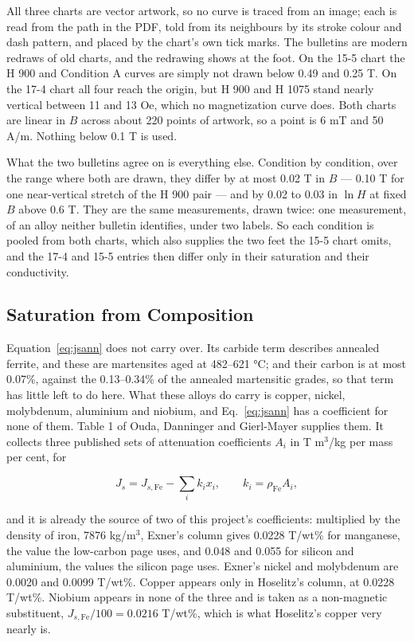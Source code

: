 \documentclass[
  11pt,
]{article}
\newcounter{none} %
\begin{document}
All three charts are vector artwork, so no curve is traced from an image; each is read from the path in the PDF, told from its neighbours by its stroke colour and dash pattern, and placed by the chart's own tick marks. The bulletins are modern redraws of old charts, and the redrawing shows at the foot. On the 15-5 chart the H 900 and Condition A curves are simply not drawn below 0.49 and 0.25 T. On the 17-4 chart all four reach the origin, but H 900 and H 1075 stand nearly vertical between 11 and 13 Oe, which no magnetization curve does. Both charts are linear in \(B\) across about 220 points of artwork, so a point is 6 mT and 50 A/m. Nothing below 0.1 T is used.

What the two bulletins agree on is everything else. Condition by condition, over the range where both are drawn, they differ by at most 0.02 T in \(B\) --- 0.10 T for one near-vertical stretch of the H 900 pair --- and by 0.02 to 0.03 in \(\ln H\) at fixed \(B\) above 0.6 T. They are the same measurements, drawn twice: one measurement, of an alloy neither bulletin identifies, under two labels. So each condition is pooled from both charts, which also supplies the two feet the 15-5 chart omits, and the 17-4 and 15-5 entries then differ only in their saturation and their conductivity.

\subsection{Saturation from Composition}\label{ph-js}

Equation~\eqref{eq:jsann} does not carry over. Its carbide term describes annealed ferrite, and these are martensites aged at 482--621 °C; and their carbon is at most 0.07\%, against the 0.13--0.34\% of the annealed martensitic grades, so that term has little left to do here. What these alloys do carry is copper, nickel, molybdenum, aluminium and niobium, and Eq.~\eqref{eq:jsann} has a coefficient for none of them. Table 1 of Ouda, Danninger and Gierl-Mayer \cite{ouda} supplies them. It collects three published sets of attenuation coefficients \(A_i\) in T m\(^3\)/kg per mass per cent, for

\begin{equation}\label{eq:jsph}
J_s = J_{s,\mathrm{Fe}} - \sum_i k_i x_i, \qquad k_i = \rho_\mathrm{Fe} A_i,
\end{equation}

and it is already the source of two of this project's coefficients: multiplied by the density of iron, 7876 kg/m\(^3\), Exner's column gives 0.0228 T/wt\% for manganese, the value the low-carbon page uses, and 0.048 and 0.055 for silicon and aluminium, the values the silicon page uses. Exner's nickel and molybdenum are 0.0020 and 0.0099 T/wt\%. Copper appears only in Hoselitz's column, at 0.0228 T/wt\%. Niobium appears in none of the three and is taken as a non-magnetic substituent, \(J_{s,\mathrm{Fe}}/100 = 0.0216\) T/wt\%, which is what Hoselitz's copper very nearly is.
\end{document}
